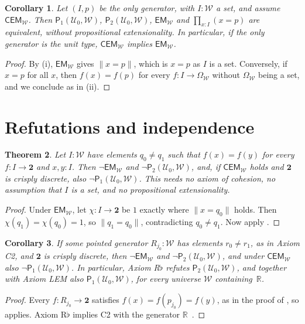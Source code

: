 \documentclass[11pt]{amsart}
\newtheorem{theorem}{Theorem}[section]
\newtheorem{corollary}[theorem]{Corollary}
\theoremstyle{definition}
\theoremstyle{remark}
\newcommand{\W}{\mathcal W}
\newcommand{\Uz}{\mathcal U_0}
\newcommand{\B}{\mathbf 2}
\newcommand{\R}{\mathbb R}
\newcommand{\Om}{\Omega}
\newcommand{\trunc}[1]{\lVert #1\rVert}
\newcommand{\EM}{\mathsf{EM}}
\newcommand{\CEM}{\mathsf{CEM}}
\newcommand{\Pone}{\mathsf P_1}
\newcommand{\Ptwo}{\mathsf P_2}
\begin{document}
\begin{corollary}\label{cor:single}
Let $(I,p)$ be the only generator, with $I:\W$ a set, and assume
$\CEM_\W$. Then $\Pone(\Uz,\W)$, $\Ptwo(\Uz,\W)$, $\EM_\W$ and
$\prod_{x:I}(x=p)$ are equivalent, without propositional extensionality.
In particular, if the only generator is the unit type, $\CEM_\W$ implies
$\EM_\W$.
\end{corollary}

\begin{proof}
By (i), $\EM_\W$ gives $\trunc{x=p}$, which is $x=p$ as $I$ is a set.
Conversely, if $x=p$ for all $x$, then $f(x)=f(p)$ for every
$f:I\to\Om_\W$ without $\Om_\W$ being a set, and we conclude as in
(ii).
\end{proof}

\section{Refutations and independence}\label{sec:refutations}

\begin{theorem}\label{thm:refutation}
Let $I:\W$ have elements $q_0\neq q_1$ such that $f(x)=f(y)$ for every
$f:I\to\B$ and $x,y:I$. Then $\neg\EM_\W$ and $\neg\Ptwo(\Uz,\W)$, and,
if $\CEM_\W$ holds and $\B$ is crisply discrete, also
$\neg\Pone(\Uz,\W)$. This needs no axiom of cohesion, no assumption that
$I$ is a set, and no propositional extensionality.
\end{theorem}

\begin{proof}
Under $\EM_\W$, let $\chi:I\to\B$ be $1$ exactly where $\trunc{x=q_0}$
holds. Then $\chi(q_1)=\chi(q_0)=1$, so $\trunc{q_1=q_0}$, contradicting
$q_0\neq q_1$. Now apply .
\end{proof}

\begin{corollary}\label{cor:C2}
If some pointed generator $R_{j_0}:\W$ has elements $r_0\neq r_1$, as in
Axiom C2, and $\B$ is crisply discrete, then $\neg\EM_\W$ and
$\neg\Ptwo(\Uz,\W)$, and under $\CEM_\W$ also $\neg\Pone(\Uz,\W)$. In
particular, Axiom R$\flat$ refutes $\Ptwo(\Uz,\W)$, and together with
Axiom LEM also $\Pone(\Uz,\W)$, for every universe $\W$ containing~$\R$.
\end{corollary}

\begin{proof}
Every $f:R_{j_0}\to\B$ satisfies $f(x)=f(p_{j_0})=f(y)$, as in the proof
of , so  applies. Axiom
R$\flat$ implies C2 with the generator $\R$~\cite[\S9]{Shulman2018}.
\end{proof}
\end{document}
